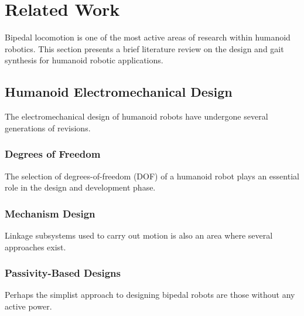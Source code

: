 \chapter{Related Work} %
\label{cha:background}
Bipedal locomotion is one of the most active areas of research within humanoid robotics. This section presents a brief literature review on the design and gait synthesis for humanoid robotic applications. 






\section{Humanoid Electromechanical Design} %
\label{sec:related_electromechanical_design}
The electromechanical design of humanoid robots have undergone several generations of revisions. 


\subsection{Degrees of Freedom} %
\label{sub:related_degrees_of_freedom}
The selection of degrees-of-freedom (DOF) of a humanoid robot plays an essential role in the design and development phase. 


\subsection{Mechanism Design} %
\label{sub:related_mechanism_design}
Linkage subsystems used to carry out motion is also an area where several approaches exist. 


\subsection{Passivity-Based Designs} %
\label{sub:related_passive_designs}
Perhaps the simplist approach to designing bipedal robots are those without any active power. 


